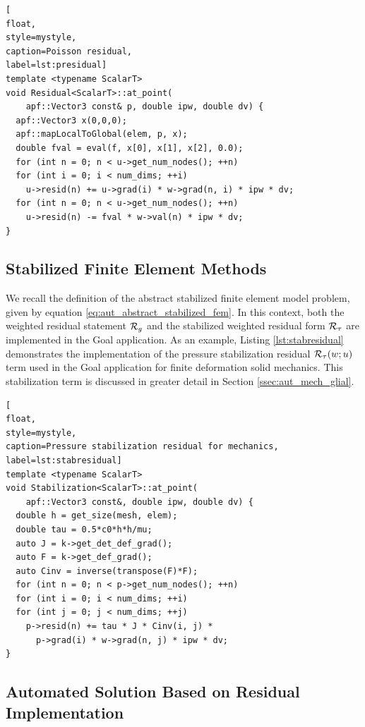 \begin{lstlisting}[
float,
style=mystyle,
caption=Poisson residual,
label=lst:presidual]
template <typename ScalarT>
void Residual<ScalarT>::at_point(
    apf::Vector3 const& p, double ipw, double dv) {
  apf::Vector3 x(0,0,0);
  apf::mapLocalToGlobal(elem, p, x);
  double fval = eval(f, x[0], x[1], x[2], 0.0);
  for (int n = 0; n < u->get_num_nodes(); ++n)
  for (int i = 0; i < num_dims; ++i)
    u->resid(n) += u->grad(i) * w->grad(n, i) * ipw * dv;
  for (int n = 0; n < u->get_num_nodes(); ++n)
    u->resid(n) -= fval * w->val(n) * ipw * dv;
}
\end{lstlisting}

\subsection{Stabilized Finite Element Methods}

We recall the definition of the abstract stabilized finite element model
problem, given by equation \eqref{eq:aut_abstract_stabilized_fem}. In this
context, both the weighted residual statement $\mathcal{R}_g$ and the stabilized
weighted residual form $\mathcal{R}_{\tau}$ are implemented in the Goal application.
As an example, Listing \ref{lst:stabresidual} demonstrates the implementation
of the pressure stabilization \cite{ramesh2005stabilized} residual
$\mathcal{R}_{\tau}(w; u)$ term used in the Goal application for finite deformation
solid mechanics. This stabilization term is discussed in greater detail
in Section \ref{ssec:aut_mech_glial}.

\begin{lstlisting}[
float,
style=mystyle,
caption=Pressure stabilization residual for mechanics,
label=lst:stabresidual]
template <typename ScalarT>
void Stabilization<ScalarT>::at_point(
    apf::Vector3 const&, double ipw, double dv) {
  double h = get_size(mesh, elem);
  double tau = 0.5*c0*h*h/mu;
  auto J = k->get_det_def_grad();
  auto F = k->get_def_grad();
  auto Cinv = inverse(transpose(F)*F);
  for (int n = 0; n < p->get_num_nodes(); ++n)
  for (int i = 0; i < num_dims; ++i)
  for (int j = 0; j < num_dims; ++j)
    p->resid(n) += tau * J * Cinv(i, j) *
      p->grad(i) * w->grad(n, j) * ipw * dv;
}
\end{lstlisting}

\subsection{Automated Solution Based on Residual Implementation}

